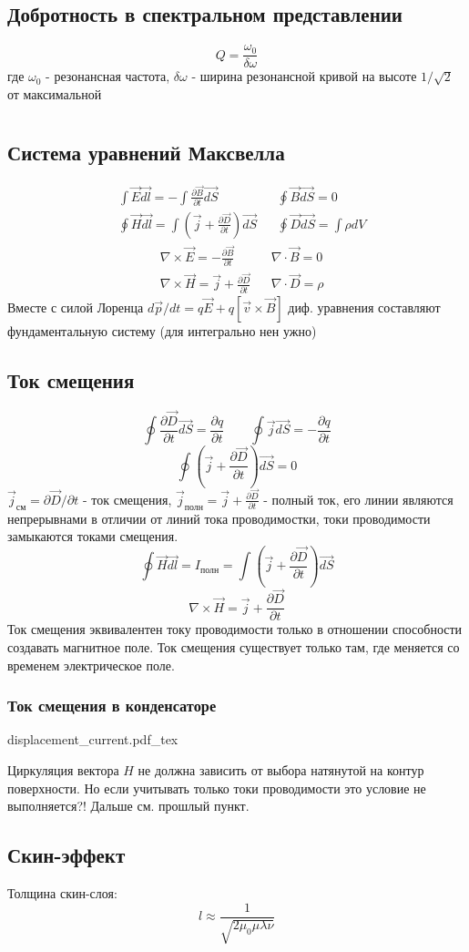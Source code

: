 \documentclass{article}
\newcommand{\incfig}[2][1]{%
    \def\svgwidth{#1\columnwidth}
    {#2.pdf_tex}
}
\begin{document}
\subsection{Добротность в спектральном представлении}
\[ Q = \frac{\omega_0}{\delta \omega}\]
где $\omega_0$ - резонансная частота, $\delta \omega$ - ширина резонансной кривой на высоте $1/\sqrt{2}$ от максимальной


\section{}
\subsection{Система уравнений Максвелла}
\[\boxed{\begin{aligned}
& \int \vec{E}\vec{dl}=-\int \frac{\partial \vec{B}}{\partial t}\vec{dS}  & & \oint \vec{B}\vec{dS}=0 \\
& \oint \vec{H}\vec{dl}=\int(\vec{j}+\frac{\partial \vec{D}}{\partial t})\vec{dS} & & \oint\vec{D}\vec{dS}=\int\rho dV 
\end{aligned}}\]
\[\boxed{\begin{aligned}
& \nabla \times \vec{E}=-\frac{\partial \vec{B}}{\partial t} & & \nabla \cdot \vec{B}=0 \\
& \nabla \times \vec{H} = \vec{j} + \frac{\partial \vec{D}}{\partial t} & & \nabla \cdot \vec{D} = \rho
\end{aligned}}\]
Вместе с силой Лоренца $d\vec{p}/dt=q\vec{E}+q[\vec{v}\times\vec{B}]$ диф. уравнения составляют фундаментальную систему (для интегрально нен ужно)
\subsection{Ток смещения}
\[\oint \frac{\partial \vec{D}}{\partial t}\vec{dS}=\frac{\partial q}{\partial t} \qquad \oint \vec{j}\vec{dS}=-\frac{\partial q}{\partial t}\]
\[\oint (\vec{j} + \frac{\partial \vec{D}}{\partial t})\vec{dS}=0\]
$\vec{j}_{\text{см}}=\partial\vec{D}/\partial t$ - ток смещения, $\vec{j}_{\text{полн}}=\vec{j}+\frac{\partial \vec{D}}{\partial t}$ - полный ток, его линии являются непрерывнами в отличии от линий тока проводимостки, токи проводимости замыкаются токами смещения.
\[\oint \vec{H}\vec{dl}=I_{\text{полн}}=\int(\vec{j}+\frac{\partial \vec{D}}{\partial t})\vec{dS}\]
\[\nabla \times \vec{H}=\vec{j}+\frac{\partial \vec{D}}{\partial t}\]
Ток смещения эквивалентен току проводимости только в отношении способности создавать магнитное поле. Ток смещения существует только там, где меняется со временем электрическое поле.
\subsubsection{Ток смещения в конденсаторе}
\incfig{displacement_current}
Циркуляция вектора $H$ не должна зависить от выбора натянутой на контур поверхности. Но если учитывать только токи проводимости это условие не выполняется?!
Дальше см. прошлый пункт.
\subsection{Скин-эффект}
Толщина скин-слоя:
\[l \approx \frac{1}{\sqrt{2\mu_0\mu\lambda\nu}}\]
\end{document}
